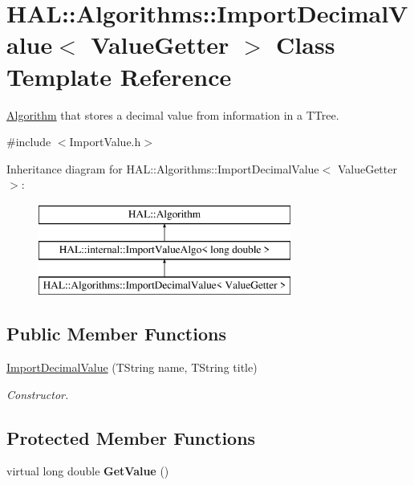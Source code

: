 \hypertarget{class_h_a_l_1_1_algorithms_1_1_import_decimal_value}{\section{H\+A\+L\+:\+:Algorithms\+:\+:Import\+Decimal\+Value$<$ Value\+Getter $>$ Class Template Reference}
\label{class_h_a_l_1_1_algorithms_1_1_import_decimal_value}
}


\hyperlink{class_h_a_l_1_1_algorithm}{Algorithm} that stores a decimal value from information in a T\+Tree.  




{\ttfamily \#include $<$Import\+Value.\+h$>$}

Inheritance diagram for H\+A\+L\+:\+:Algorithms\+:\+:Import\+Decimal\+Value$<$ Value\+Getter $>$\+:\begin{figure}[H]
\begin{center}
\leavevmode
\includegraphics[height=3.000000cm]{class_h_a_l_1_1_algorithms_1_1_import_decimal_value}
\end{center}
\end{figure}
\subsection*{Public Member Functions}
\begin{DoxyCompactItemize}
\item 
\hyperlink{class_h_a_l_1_1_algorithms_1_1_import_decimal_value_aa1f2c9f13b324cbef3d8632b64e21419}{Import\+Decimal\+Value} (T\+String name, T\+String title)
\begin{DoxyCompactList}\small\item\em Constructor. \end{DoxyCompactList}\end{DoxyCompactItemize}
\subsection*{Protected Member Functions}
\begin{DoxyCompactItemize}
\item 
\hypertarget{class_h_a_l_1_1_algorithms_1_1_import_decimal_value_aaa975cb712b925aae8dd1a4ed7acfa41}{virtual long double {\bfseries Get\+Value} ()}\label{class_h_a_l_1_1_algorithms_1_1_import_decimal_value_aaa975cb712b925aae8dd1a4ed7acfa41}

\end{DoxyCompactItemize}
